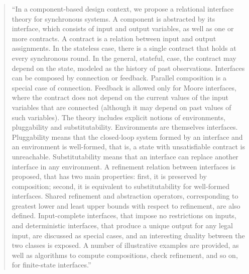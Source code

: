                \begin{quotation}
                 ``In a component-based design context, we propose a relational interface
                 theory for synchronous systems. A component is abstracted by its
                 interface, which consists of input and output variables, as well as
                 one or more contracts. A contract is a relation between input and
                 output assignments. In the stateless case, there is a single contract
                 that holds at every synchronous round. In the general, stateful, case,
                 the contract may depend on the state, modeled as the history of past
                 observations. Interfaces can be composed by connection or
                 feedback. Parallel composition is a special case of
                 connection. Feedback is allowed only for Moore interfaces, where the
                 contract does not depend on the current values of the input variables
                 that are connected (although it may depend on past values of such
                 variables). The theory includes explicit notions of environments,
                 pluggability and substitutability. Environments are themselves
                 interfaces. Pluggability means that the closed-loop system formed by
                 an interface and an environment is well-formed, that is, a state with
                 unsatisfiable contract is unreachable. Substitutability means that an
                 interface can replace another interface in any environment. A
                 refinement relation between interfaces is proposed, that has two main
                 properties: first, it is preserved by composition; second, it is
                 equivalent to substitutability for well-formed interfaces. Shared
                 refinement and abstraction operators, corresponding to greatest lower
                 and least upper bounds with respect to refinement, are also
                 defined. Input-complete interfaces, that impose no restrictions on
                 inputs, and deterministic interfaces, that produce a unique output for
                 any legal input, are discussed as special cases, and an interesting
                 duality between the two classes is exposed. A number of illustrative
                 examples are provided, as well as algorithms to compute compositions,
                 check refinement, and so on, for finite-state interfaces.''
               \end{quotation}

